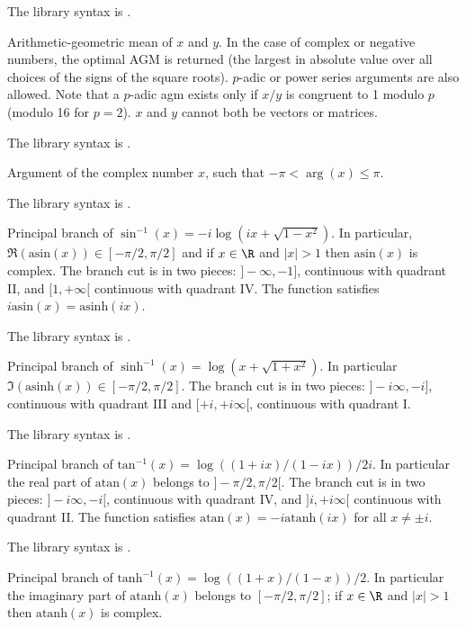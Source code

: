 The library syntax is .

\label{se:agm}
Arithmetic-geometric mean of $x$ and $y$. In the
case of complex or negative numbers, the optimal AGM is returned
(the largest in absolute value over all choices of the signs of the square
roots).  $p$-adic or power series arguments are also allowed. Note that
a $p$-adic agm exists only if $x/y$ is congruent to 1 modulo $p$ (modulo
16 for $p=2$). $x$ and $y$ cannot both be vectors or matrices.

The library syntax is .

\label{se:arg}
Argument of the complex number $x$, such that $-\pi < \arg(x) \le \pi$.

The library syntax is .

\label{se:asin}
Principal branch of $\sin^{-1}(x) = -i \log(ix + \sqrt{1 - x^2})$.
In particular, $\Re(\text{asin}(x))\in [-\pi/2,\pi/2]$ and if $x\in \R$ and
$|x|>1$ then $\text{asin}(x)$ is complex. The branch cut is in two pieces:
$]-\infty,-1]$, continuous with quadrant II, and $[1,+\infty[$ continuous
with quadrant IV. The function satisfies $i \text{asin}(x) =
\text{asinh}(ix)$.

The library syntax is .

\label{se:asinh}
Principal branch of $\sinh^{-1}(x) = \log(x + \sqrt{1+x^2})$. In
particular $\Im(\text{asinh}(x))\in [-\pi/2,\pi/2]$.
The branch cut is in two pieces: $]-i \infty ,-i]$, continuous with quadrant
III and $[+i,+i \infty[$, continuous with quadrant I.

The library syntax is .

\label{se:atan}
Principal branch of $\text{tan}^{-1}(x) = \log ((1+ix)/(1-ix)) /
2i$. In particular the real part of $\text{atan}(x)$ belongs to
$]-\pi/2,\pi/2[$.
The branch cut is in two pieces:
$]-i\infty,-i[$, continuous with quadrant IV, and $]i,+i \infty[$ continuous
with quadrant II. The function satisfies $\text{atan}(x) =
-i\text{atanh}(ix)$ for all $x\neq \pm i$.

The library syntax is .

\label{se:atanh}
Principal branch of $\text{tanh}^{-1}(x) = \log ((1+x)/(1-x)) / 2$. In
particular the imaginary part of $\text{atanh}(x)$ belongs to
$[-\pi/2,\pi/2]$; if $x\in \R$ and $|x|>1$ then $\text{atanh}(x)$ is complex.

